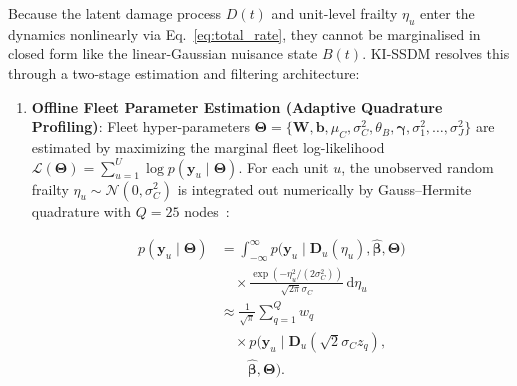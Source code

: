 \documentclass[a4paper,fleqn]{cas-dc}
\begin{document}
Because the latent damage process $D(t)$ and unit-level frailty $\eta_u$ enter the dynamics nonlinearly via Eq.~\eqref{eq:total_rate}, they cannot be marginalised in closed form like the linear-Gaussian nuisance state $B(t)$. KI-SSDM resolves this through a two-stage estimation and filtering architecture:
\begin{enumerate}[label=\textbf{Stage \arabic*:},leftmargin=3.0em]
    \item \textbf{Offline Fleet Parameter Estimation (Adaptive Quadrature Profiling)}: Fleet hyper-parameters $\boldsymbol{\Theta} = \{\mathbf{W}, \mathbf{b}, \mu_C, \sigma_C^2, \theta_B, \boldsymbol{\gamma}, \sigma_1^2, \dots, \sigma_J^2\}$ are estimated by maximizing the marginal fleet log-likelihood $\mathcal{L}(\boldsymbol{\Theta}) = \sum_{u=1}^U \log p(\mathbf{y}_u \mid \boldsymbol{\Theta})$. For each unit $u$, the unobserved random frailty $\eta_u \sim \mathcal{N}(0, \sigma_C^2)$ is integrated out numerically by Gauss--Hermite quadrature with $Q = 25$ nodes~\cite{Liu_1994, Pinheiro_1995}:
    
\begin{equation}
\label{eq:quadrature_marginal}
\begin{aligned}
p(\mathbf{y}_u \mid \boldsymbol{\Theta})
&= \int_{-\infty}^{\infty}
p\bigl(\mathbf{y}_u \mid
\mathbf{D}_u(\eta_u),
\hat{\boldsymbol{\beta}},
\boldsymbol{\Theta}\bigr)\\
&\quad \times
\frac{\exp\!\left(
-\eta_u^2/(2\sigma_C^2)
\right)}
{\sqrt{2\pi}\sigma_C}
\,\mathrm{d}\eta_u\\[2pt]
&\approx \frac{1}{\sqrt{\pi}}
\sum_{q=1}^{Q} w_q\\
&\quad \times
p\bigl(\mathbf{y}_u \mid
\mathbf{D}_u(\sqrt{2}\sigma_C z_q),\\
&\qquad
\hat{\boldsymbol{\beta}},
\boldsymbol{\Theta}\bigr).
\end{aligned}
\end{equation}


\end{enumerate}
\end{document}
